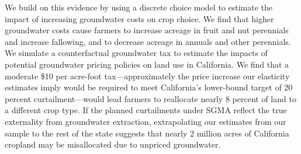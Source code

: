 We build on this evidence by using a discrete choice model to estimate the impact of increasing groundwater costs on crop choice. We find that higher groundwater costs cause farmers to increase acreage in fruit and nut perennials and increase fallowing, and to decrease acreage in annuals and other perennials. We simulate a counterfactual groundwater tax to estimate the impacts of potential groundwater pricing policies on land use in California. We find that a moderate \$10 per acre-foot tax---approximately the price increase our elasticity estimates imply would be required to meet California's lower-bound target of 20 percent curtailment---would lead farmers to reallocate nearly 8 percent of land to a different crop type. If the planned curtailments under SGMA reflect the true externality from groundwater extraction, extrapolating our estimates from our sample to the rest of the state suggests that nearly 2 million acres of California cropland may be misallocated due to unpriced groundwater.




